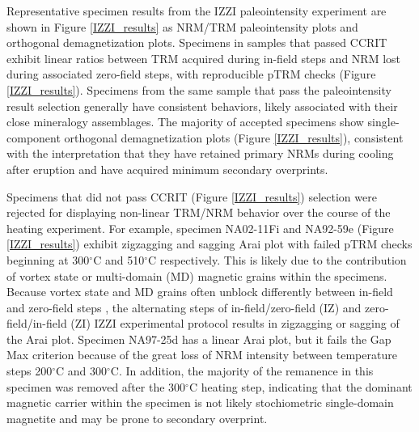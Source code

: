 \documentclass[draft]{agujournal2019}
\begin{document}
Representative specimen results from the IZZI paleointensity experiment are shown in Figure \ref{IZZI_results} as NRM/TRM paleointensity plots and orthogonal demagnetization plots. Specimens in samples that passed CCRIT exhibit linear ratios between TRM acquired during in-field steps and NRM lost during associated zero-field steps, with reproducible pTRM checks (Figure \ref{IZZI_results}). Specimens from the same sample that pass the paleointensity result selection generally have consistent behaviors, likely associated with their close mineralogy assemblages. The majority of accepted specimens show single-component orthogonal demagnetization plots (Figure \ref{IZZI_results}), consistent with the interpretation that they have retained primary NRMs during cooling after eruption and have acquired minimum secondary overprints. 

Specimens that did not pass CCRIT (Figure \ref{IZZI_results}) selection were rejected for displaying non-linear TRM/NRM behavior over the course of the heating experiment. For example, specimen NA02-11Fi and NA92-59e (Figure \ref{IZZI_results}) exhibit zigzagging and sagging Arai plot with failed pTRM checks beginning at 300$^{\circ}$C and 510$^{\circ}$C respectively. This is likely due to the contribution of vortex state or multi-domain (MD) magnetic grains within the specimens. Because vortex state and MD grains often unblock differently between in-field and zero-field steps \cite{Tauxe2004a, Yu2004a}, the alternating steps of in-field/zero-field (IZ) and zero-field/in-field (ZI) IZZI experimental protocol results in zigzagging or sagging of the Arai plot. Specimen NA97-25d has a linear Arai plot, but it fails the Gap Max criterion because of the great loss of NRM intensity between temperature steps 200$^{\circ}$C and 300$^{\circ}$C. In addition, the majority of the remanence in this specimen was removed after the 300$^{\circ}$C heating step, indicating that the dominant magnetic carrier within the specimen is not likely stochiometric single-domain magnetite and may be prone to secondary overprint. %
\end{document}

